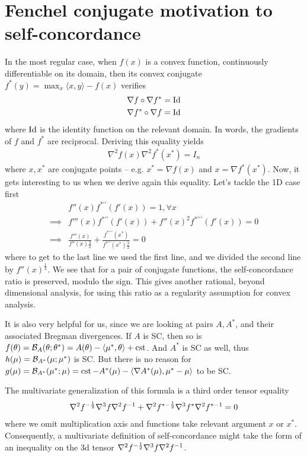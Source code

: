 \documentclass{article}
\newcommand{\logpart}{A}
\newcommand{\conj}{\logpart^*}
\newcommand{\bregman}{\cB_\logpart}
\newcommand{\bregmanconj}{\cB_{\logpart^*}}
\newcommand{\natp}{\theta}
\newcommand{\meanp}{\mu}
\begin{document}
\section{Fenchel conjugate motivation to self-concordance}

In the most regular case, when $f(x)$ is a convex function, continuously differentiable on its domain, then its convex conjugate $f^*(y) = \max_x \langle x, y \rangle - f(x)$ verifies
\begin{align}
    \nabla f \circ \nabla f^*  &= \mathrm{Id} \\
     \nabla f^* \circ \nabla f &= \mathrm{Id}
\end{align}
where $\mathrm{Id}$ is the identity function on the relevant domain. In words, the gradients of $f$ and $f^*$ are reciprocal.
Deriving this equality yields
\begin{align}
    \nabla^2 f(x) \nabla^2 f^*(x^*) = I_n
\end{align}
where $x,x^*$ are conjugate points -- e.g. $x^*=\nabla f(x)$ and $x = \nabla f^*(x^*)$.
Now, it gets interesting to us when we derive again this equality. Let's tackle the 1D case first
\begin{align}
    &f''(x) f^{* \prime \prime}(f'(x)) = 1, \forall x \\
    \implies
    &f'''(x)f^{* \prime \prime}(f'(x))  + f''(x)^2 f^{* \prime \prime \prime}(f'(x))  = 0 \\
    \implies
    &\frac{f'''(x)}{f''(x){\frac{3}{2}}}  + \frac{f^{* \prime \prime \prime}(x^*)}{f^{* \prime \prime}(x^*){\frac{3}{2}}}  = 0
\end{align}
where to get to the last line we used the first line, and we divided the second line by $f''(x)^{\frac{1}{2}}$. 
We see that for a pair of conjugate functions, the self-concordance ratio is preserved, modulo the sign.
This gives another rational, beyond dimensional analysis, for using this ratio as a regularity assumption for convex analysis. 

It is also very helpful for us, since we are looking at pairs $\logpart, \conj$, and their associated Bregman divergences. 
If $\logpart$ is SC, then so is 
$f(\natp)= \bregman(\natp ; \natp^*) = \logpart(\natp) - \langle \meanp^*, \natp \rangle + \cst$. 
And $\conj$ is SC as well, thus  $h(\meanp) = \bregmanconj ( \meanp ; \meanp^*)$ is SC.
But there is no reason for 
$g(\meanp) = \bregmanconj ( \meanp^* ; \meanp) =  \cst - \conj(\meanp) - \langle \nabla \conj (\meanp), \meanp^* - \meanp \rangle $ to be SC. 

The multivariate generalization of this formula is a third order tensor equality
\begin{align}
    \nabla^2 f^{-\frac{1}{2}} \nabla^3 f \nabla^2 f^{-1} + \nabla^2 f^{* -\frac{1}{2}} \nabla^3 f^* \nabla^2 f^{* -1} = 0
\end{align}
where we omit  multiplication axis and functions take relevant argument $x$ or $x^*$. Consequently, a multivariate definition of self-concordance might take the form of an inequality on the 3d tensor $\nabla^2 f^{-\frac{1}{2}} \nabla^3 f \nabla^2 f^{-1}$.
\end{document}
